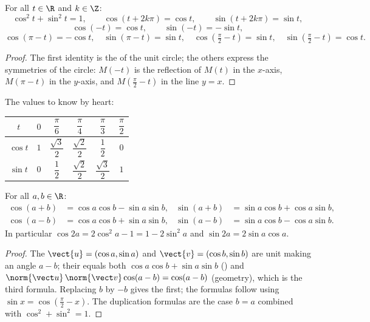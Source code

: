 \begin{proposition}\label{prop:g12:trigo:identities}
For all $t \in \R$ and $k \in \Z$:
\[
\cos^2 t + \sin^2 t = 1, \qquad
\cos(t + 2k\pi) = \cos t, \qquad
\sin(t + 2k\pi) = \sin t,
\]
\[
\cos(-t) = \cos t, \qquad \sin(-t) = -\sin t,
\]
\[
\cos(\pi - t) = -\cos t, \quad \sin(\pi - t) = \sin t, \quad
\cos\left(\tfrac{\pi}{2} - t\right) = \sin t, \quad
\sin\left(\tfrac{\pi}{2} - t\right) = \cos t .
\]
\end{proposition}

\begin{proof}
The first identity is the  of the unit circle; the others express the
symmetries of the circle: $M(-t)$ is the reflection of $M(t)$ in the
$x$-axis, $M(\pi - t)$ in the $y$-axis, and $M(\frac\pi2 - t)$ in the line
$y = x$.
\end{proof}

The values to know by heart:
\begin{center}
\begin{tabular}{c|ccccc}
$t$ & $0$ & $\dfrac{\pi}{6}$ & $\dfrac{\pi}{4}$ & $\dfrac{\pi}{3}$ & $\dfrac{\pi}{2}$\\[6pt]
\hline\rule{0pt}{14pt}%
$\cos t$ & $1$ & $\dfrac{\sqrt3}{2}$ & $\dfrac{\sqrt2}{2}$ & $\dfrac12$ & $0$\\[6pt]
$\sin t$ & $0$ & $\dfrac12$ & $\dfrac{\sqrt2}{2}$ & $\dfrac{\sqrt3}{2}$ & $1$
\end{tabular}
\end{center}

\begin{proposition}\label{prop:g12:trigo:addition}
For all $a, b \in \R$:
\begin{align*}
\cos(a+b) &= \cos a \cos b - \sin a \sin b, &
\sin(a+b) &= \sin a \cos b + \cos a \sin b,\\
\cos(a-b) &= \cos a \cos b + \sin a \sin b, &
\sin(a-b) &= \sin a \cos b - \cos a \sin b.
\end{align*}
In particular $\cos 2a = 2\cos^2 a - 1 = 1 - 2\sin^2 a$ and
$\sin 2a = 2 \sin a \cos a$.
\end{proposition}

\begin{proof}
The  $\vect{u} = (\cos a, \sin a)$ and $\vect{v} = (\cos b, \sin b)$
are unit  making an angle $a - b$; their  equals both
$\cos a\cos b + \sin a \sin b$ () and
$\norm{\vect u}\,\norm{\vect v}\cos(a-b) = \cos(a - b)$ (geometry), which is
the third formula. Replacing $b$ by $-b$ gives the first; the  formulas
follow using $\sin x = \cos(\frac\pi2 - x)$. The duplication formulas are the
case $b = a$ combined with $\cos^2 + \sin^2 = 1$.
\end{proof}

